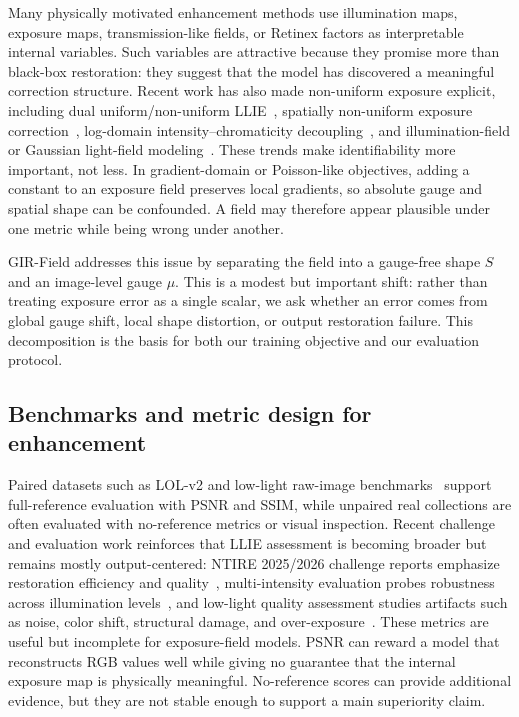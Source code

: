 Many physically motivated enhancement methods use illumination maps, exposure maps, transmission-like fields, or Retinex factors as interpretable internal variables. Such variables are attractive because they promise more than black-box restoration: they suggest that the model has discovered a meaningful correction structure. Recent work has also made non-uniform exposure explicit, including dual uniform/non-uniform LLIE~\cite{perez-zarate2024alen}, spatially non-uniform exposure correction~\cite{li2026rethinkingexposure}, log-domain intensity--chromaticity decoupling~\cite{bai2026rethinkinglowlight}, and illumination-field or Gaussian light-field modeling~\cite{chen2026aigsnet,chen2026gaussianlightfield}. These trends make identifiability more important, not less. In gradient-domain or Poisson-like objectives, adding a constant to an exposure field preserves local gradients, so absolute gauge and spatial shape can be confounded. A field may therefore appear plausible under one metric while being wrong under another.

GIR-Field addresses this issue by separating the field into a gauge-free shape $S$ and an image-level gauge $\mu$. This is a modest but important shift: rather than treating exposure error as a single scalar, we ask whether an error comes from global gauge shift, local shape distortion, or output restoration failure. This decomposition is the basis for both our training objective and our evaluation protocol.

\subsection{Benchmarks and metric design for enhancement}

Paired datasets such as LOL-v2 and low-light raw-image benchmarks~\cite{chen2018sid} support full-reference evaluation with PSNR and SSIM, while unpaired real collections are often evaluated with no-reference metrics or visual inspection. Recent challenge and evaluation work reinforces that LLIE assessment is becoming broader but remains mostly output-centered: NTIRE 2025/2026 challenge reports emphasize restoration efficiency and quality~\cite{liu2025ntire2025challenge,yan2026ntire2026challenge}, multi-intensity evaluation probes robustness across illumination levels~\cite{pilligua2025evaluatinglowlight}, and low-light quality assessment studies artifacts such as noise, color shift, structural damage, and over-exposure~\cite{sun2026leiqassessor}. These metrics are useful but incomplete for exposure-field models. PSNR can reward a model that reconstructs RGB values well while giving no guarantee that the internal exposure map is physically meaningful. No-reference scores can provide additional evidence, but they are not stable enough to support a main superiority claim.


